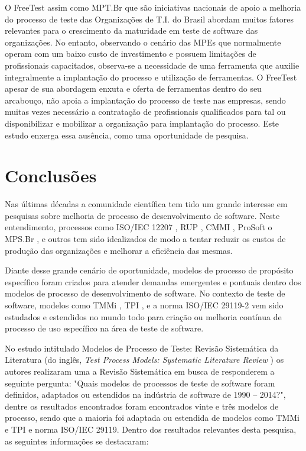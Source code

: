 O FreeTest assim como MPT.Br que são iniciativas nacionais de apoio a melhoria do processo de teste das Organizações de T.I. do Brasil abordam muitos fatores relevantes para o crescimento da maturidade em teste de software das organizações. No entanto, observando o cenário das MPEs que normalmente operam com um baixo custo de investimento e possuem limitações de profissionais capacitados, observa-se a necessidade de uma ferramenta que auxilie integralmente a implantação do processo e utilização de ferramentas. O FreeTest apesar de sua abordagem enxuta e oferta de ferramentas dentro do seu arcabouço, não apoia a implantação do processo de teste nas empresas, sendo muitas vezes necessário a contratação de profissionais qualificados para tal ou disponibilizar e mobilizar a organização para implantação do processo. Este estudo enxerga essa ausência, como uma oportunidade de pesquisa.

\section{Conclusões}
\label{sec:conclusoescap2}

Nas últimas décadas a comunidade científica tem tido um grande interesse em pesquisas sobre melhoria de processo de desenvolvimento de software. Neste entendimento, processos como ISO/IEC 12207 \cite{Mitasiunas2014}, RUP \cite{Veenendaal2012}, CMMI \cite{cmmi}, ProSoft \cite{Mitasiunas2014} o MPS.Br \cite{Softex}, e outros tem sido idealizados de modo a tentar reduzir os custos de produção das organizações e melhorar a eficiência das mesmas.

Diante desse grande cenário de oportunidade, modelos de processo de propósito específico foram criados para atender demandas emergentes e pontuais dentro dos modelos de processo de desenvolvimento de software. No contexto de teste de software, modelos como TMMi \cite{Veenendaal2012}, TPI \cite{Mitasiunas2014}, e a norma ISO/IEC 29119-2 \cite{Standard2013} vem sido estudados e estendidos no mundo todo para criação ou melhoria contínua de processo de uso específico na área de teste de software.

No estudo intitulado Modelos de Processo de Teste: Revisão Sistemática da Literatura (do inglês, \textit{Test Process Models: Systematic Literature Review} \cite{Carlo2010}) os autores realizaram uma a Revisão Sistemática em busca de responderem a seguinte pergunta: "Quais modelos de processos de teste de software foram definidos, adaptados ou estendidos na indústria de software de 1990 – 2014?", dentre os resultados encontrados foram encontrados vinte e três modelos de processo, sendo que a maioria foi adaptada ou estendida de modelos como TMMi e TPI e norma ISO/IEC 29119. Dentro dos resultados relevantes desta pesquisa, as seguintes informações se destacaram:

